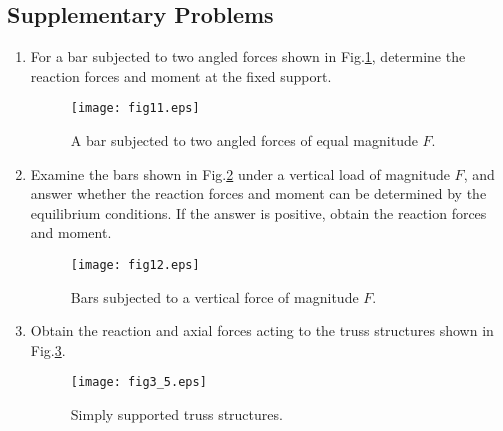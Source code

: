 ﻿\documentclass[10pt,a4j]{article}
\begin{document}
\subsection{Supplementary Problems}
\begin{enumerate}
\item
For a bar subjected to two angled forces shown in Fig.\ref{fig:fig11}, 
determine the reaction forces and moment at the fixed support.
\begin{figure}[h]
	\begin{center}
	\texttt{[image: fig11.eps]} 
	\end{center}
	\caption{A bar subjected to two angled forces of equal magnitude $F$.}
	\label{fig:fig11}
\end{figure}
\item
	Examine the bars shown in Fig.\ref{fig:fig12} under a vertical load 
	of magnitude $F$, and answer whether the reaction forces and 
	moment can be determined by the equilibrium conditions.
	If the answer is positive, obtain the reaction forces and moment. 
\begin{figure}[h]
	\begin{center}
	\texttt{[image: fig12.eps]} 
	\end{center}
	\caption{Bars subjected to a vertical force of magnitude $F$.} 
	\label{fig:fig12}
\end{figure}
\item
Obtain the reaction and axial forces acting to the truss structures shown in Fig.\ref{fig:fig3_5}.
\begin{figure}[h]
	\begin{center}
	\texttt{[image: fig3\_5.eps]} 
	\end{center}
	\caption{Simply supported truss structures.} 
	\label{fig:fig3_5}
\end{figure}
\end{enumerate}
\end{document}
